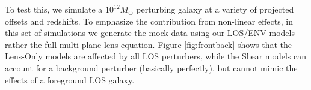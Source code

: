 To test this, we simulate a $10^{12} M_\odot$ perturbing galaxy at a variety of projected offsets and redshifts. To emphasize the contribution from non-linear effects, in this set of simulations we generate the mock data using our LOS/ENV models rather the full multi-plane lens equation. Figure \ref{fig:frontback} shows that the Lens-Only models are affected by all LOS perturbers, while the Shear models can account for a background perturber (basically perfectly), but cannot mimic the effects of a foreground LOS galaxy.